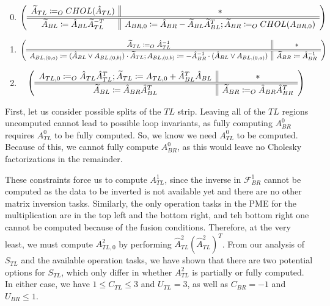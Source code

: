 \documentclass[12pt,letterpaper]{article}
\newcommand*{\opF}{\mathcal{F}}
\begin{document}
\begin{enumerate}
\setcounter{enumi}{-1} %
\item
  \begin{equation*}
  \left( \begin{array}{c || c} \widetilde{A}_{TL} \coloneqq_O CHOL(\hat{A}_{TL}) & * \\ \hline \hline \widetilde{A}_{BL} \coloneqq \hat{A}_{BL}\widetilde{A}_{TL}^{-T} & A_{BR, 0} \coloneqq \hat{A}_{BR} - \widetilde{A}_{BL}\widetilde{A}_{BL}^T; \widetilde{A}_{BR} \coloneqq_O CHOL(A_{BR, 0}) \end{array} \right)
  \end{equation*}
\item
  \begin{equation*}
    \left( \begin{array}{c || c} \widetilde{A}_{TL} \coloneqq_O \hat{A}_{TL}^{-1} & * \\ \hline \hline A_{BL, (0, a)} \coloneqq (\hat{A}_{BL} \vee A_{BL, (0, b)}) \cdot \widetilde{A}_{TL}; A_{BL, (0, b)} \coloneqq -\hat{A}_{BR}^{-1} \cdot (\hat{A}_{BL} \vee A_{BL, (0, a)}) & \widetilde{A}_{BR} \coloneqq \hat{A}_{BR}^{-1} \end{array} \right)
  \end{equation*}
\item
  \begin{equation*}
    \left( \begin{array}{c || c} A_{TL, 0} \coloneqq_O \hat{A}_{TL}\hat{A}_{TL}^T; \widetilde{A}_{TL} \coloneqq A_{TL, 0} + \hat{A}_{BL}^T\hat{A}_{BL} & * \\ \hline \hline \widetilde{A}_{BL} \coloneqq \hat{A}_{BR}\hat{A}_{BL}^T & \widetilde{A}_{BR} \coloneqq_O \hat{A}_{BR}\hat{A}_{BR}^T \end{array} \right)
  \end{equation*}
\end{enumerate}

First, let us consider possible splits of the $TL$ strip.
Leaving all of the $TL$ regions uncomputed cannot lead to possible loop invariants, as fully computing $A_{BR}^0$ requires $A_{TL}^0$ to be fully computed.
So, we know we need $A_{TL}^0$ to be computed.
Because of this, we cannot fully compute $A_{BR}^0$, as this would leave no Cholesky factorizations in the remainder.

These constraints force us to compute $A_{TL}^1$, since the inverse in $\opF_{BR}^1$ cannot be computed as the data to be inverted is not available yet and there are no other matrix inversion tasks.
Similarly, the only operation tasks in the PME for the multiplication are in the top left and the bottom right, and teh bottom right one cannot be computed because of the fusion conditions.
Therefore, at the very least, we must compute $A_{TL, 0}^2$ by performing $\hat{A}^2_{TL}(\hat{A}^2_{TL})^T$.
From our analysis of $S_{TL}$ and the available operation tasks, we have shown that there are two potential options for $S_{TL}$, which only differ in whether $A_{TL}^2$ is partially or fully computed.
In either case, we have $1 \leq C_{TL} \leq 3$ and $U_{TL} = 3$, as well as $C_{BR} = -1$ and $U_{BR} \leq 1$.
\end{document}
